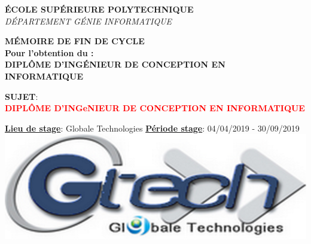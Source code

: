 \documentclass[a4paper, 12pt]{report}
\begin{document}
\begin{titlepage}
		\textsc{\small \textbf{ÉCOLE SUPÉRIEURE POLYTECHNIQUE}}\\[0.15cm] %
		\textsc{\small {\textit {DÉPARTEMENT GÉNIE INFORMATIQUE}}}\\[0.15cm] %
		
		\begin{tcolorbox}[colback=white,colframe=myblue]
			\centering
			\textcolor{myblue}{\small{\textbf{MÉMOIRE DE FIN DE CYCLE}}}\\
			\small{\textbf{Pour l’obtention du :} \\
				\textbf{DIPLÔME D'INGÉNIEUR DE CONCEPTION EN INFORMATIQUE}} %
		\end{tcolorbox}
		
		\begin{tcolorbox}[colback=white,colframe=myblue]
			\centering
			\textbf{\small{SUJET}}: \\
			\textcolor{red}{\textbf {DIPLÔME D'INGeNIEUR DE CONCEPTION EN INFORMATIQUE}} %
		\end{tcolorbox}
		
		
		
		\begin{tcolorbox}[colback=white,colframe=myblue]
			\small{\textbf{\underline{Lieu de stage}}: \textcolor{myblue}{Globale Technologies} \quad \textbf{\underline{Période stage}}: \textcolor{myblue}{04/04/2019 - 30/09/2019}}\\
			\centering
			\includegraphics[scale=.1]{img/gtech} %
		\end{tcolorbox}
		

\end{titlepage}
\end{document}
